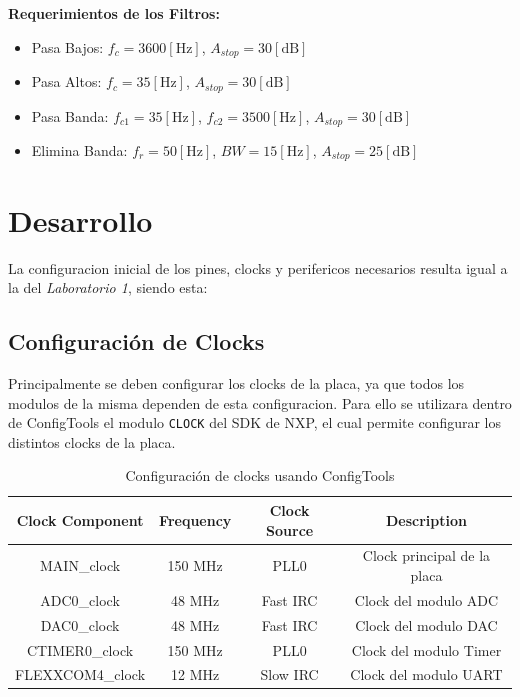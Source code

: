 \documentclass[11pt,a4paper]{article}
\begin{document}
\textbf{Requerimientos de los Filtros:}

\begin{itemize}
    \item Pasa Bajos: $f_c = 3600 [\text{Hz}]$, $A_{stop} = 30 [\text{dB}]$
    \item Pasa Altos: $f_c = 35 [\text{Hz}]$, $A_{stop} = 30 [\text{dB}]$
    \item Pasa Banda: $f_{c1} = 35 [\text{Hz}]$, $f_{c2} = 3500 [\text{Hz}]$, $A_{stop} =
              30 [\text{dB}]$
    \item Elimina Banda: $f_r = 50 [\text{Hz}]$, $BW = 15 [\text{Hz}]$, $A_{stop} = 25
                  [\text{dB}]$
\end{itemize}

\section{Desarrollo}

La configuracion inicial de los pines, clocks y perifericos necesarios resulta
igual a la del \textit{Laboratorio 1}, siendo esta:

\subsection{Configuración de Clocks}

Principalmente se deben configurar los clocks de la placa, ya que todos los
modulos de la misma dependen de esta configuracion. Para ello se utilizara
dentro de ConfigTools el modulo \texttt{CLOCK} del SDK de NXP, el cual permite
configurar los distintos clocks de la placa.

\begin{table}[H]
    \centering
    \begin{tabular}{|c|c|c|c|}
        \hline
        \textbf{Clock Component} & \textbf{Frequency} & \textbf{Clock Source} & \textbf{Description}        \\
        \hline
        MAIN\_clock              & 150 MHz            & PLL0                  & Clock principal de la placa \\
        ADC0\_clock              & 48 MHz             & Fast IRC              & Clock del modulo ADC        \\
        DAC0\_clock              & 48 MHz             & Fast IRC              & Clock del modulo DAC        \\
        CTIMER0\_clock           & 150 MHz            & PLL0                  & Clock del modulo Timer      \\
        FLEXXCOM4\_clock         & 12 MHz             & Slow IRC              & Clock del modulo UART       \\
        \hline
    \end{tabular}
    \caption{Configuración de clocks usando ConfigTools}
\end{table}
\end{document}
